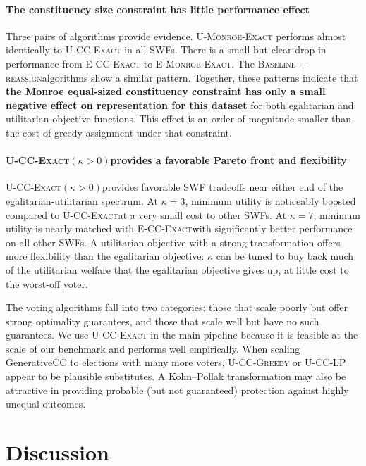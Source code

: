 \documentclass[letterpaper]{article} %
\newcommand{\Exact}{\textsc{U-CC-Exact}}
\newcommand{\ExactP}{\textsc{U-CC-Exact}$(\kappa>0)$}
\newcommand{\Greedy}{\textsc{U-CC-Greedy}}
\newcommand{\LP}{\textsc{U-CC-LP}}
\newcommand{\ExactMonroe}{\textsc{U-Monroe-Exact}}
\newcommand{\EExactMonroe}{\textsc{E-Monroe-Exact}}
\newcommand{\ECCExact}{\textsc{E-CC-Exact}}
\newcommand{\BaselineReassign}{\textsc{Baseline + reassign}}
\begin{document}
\paragraph{The constituency size constraint has little performance effect}
Three pairs of algorithms provide evidence.
\ExactMonroe{} performs almost identically to \Exact{} in all SWFs.
There is a small but clear drop in performance from \ECCExact{} to \EExactMonroe{}.
The \BaselineReassign algorithms show a similar pattern.
Together, these patterns indicate that \textbf{the Monroe equal-sized constituency constraint has only a small negative effect on representation for this dataset} for both egalitarian and utilitarian objective functions.
This effect is an order of magnitude smaller than the cost of greedy assignment under that constraint.

\paragraph{\ExactP provides a favorable Pareto front and flexibility}
\ExactP provides favorable SWF tradeoffs near either end of the egalitarian-utilitarian spectrum.
At \(\kappa=3\), minimum utility is noticeably boosted compared to \Exact at a very small cost to other SWFs.
At \(\kappa=7\), minimum utility is nearly matched with \ECCExact with significantly better performance on all other SWFs.
A utilitarian objective with a strong transformation offers more flexibility than the egalitarian objective: \(\kappa\) can be tuned to buy back much of the utilitarian welfare that the egalitarian objective gives up, at little cost to the worst-off voter.

The voting algorithms fall into two categories: those that scale poorly but offer strong optimality guarantees, and those that scale well but have no such guarantees.
We use \Exact{} in the main pipeline because it is feasible at the scale of our benchmark and performs well empirically.
When scaling GenerativeCC to elections with many more voters, \Greedy{} or \LP{} appear to be plausible substitutes.
A Kolm--Pollak transformation may also be attractive in providing probable (but not guaranteed) protection against highly unequal outcomes.

\section{Discussion}
\end{document}

